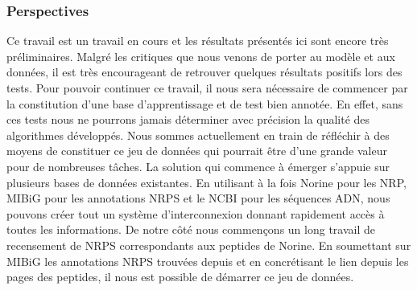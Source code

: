 \subsubsection{Perspectives}

Ce travail est un travail en cours et les résultats présentés ici sont encore très préliminaires.
Malgré les critiques que nous venons de porter au modèle et aux données, il est très encourageant de retrouver quelques résultats positifs lors des tests.
Pour pouvoir continuer ce travail, il nous sera nécessaire de commencer par la constitution d'une base d'apprentissage et de test bien annotée.
En effet, sans ces tests nous ne pourrons jamais déterminer avec précision la qualité des algorithmes développés.
Nous sommes actuellement en train de réfléchir à des moyens de constituer ce jeu de données qui pourrait être d'une grande valeur pour de nombreuses tâches.
La solution qui commence à émerger s'appuie sur plusieurs bases de données existantes.
En utilisant à la fois Norine pour les NRP, MIBiG pour les annotations NRPS et le NCBI pour les séquences ADN, nous pouvons créer tout un système d'interconnexion donnant rapidement accès à toutes les informations.
De notre côté nous commençons un long travail de recensement de NRPS correspondants aux peptides de Norine.
En soumettant sur MIBiG les annotations NRPS trouvées depuis et en concrétisant le lien depuis les pages des peptides, il nous est possible de démarrer ce jeu de données.